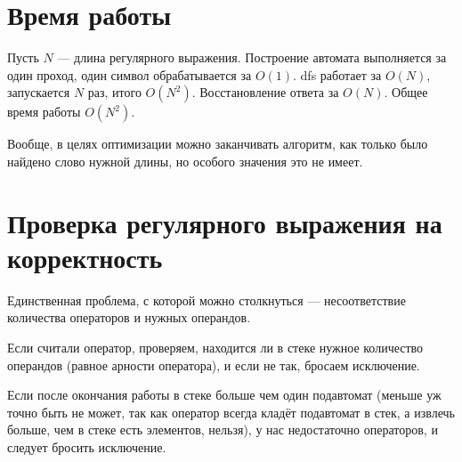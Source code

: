 \documentclass[a4paper,10pt, russian]{article}
\begin{document}
	\section{Время работы}
	Пусть $N$ --- длина регулярного выражения. Построение автомата выполняется за один проход, один символ обрабатывается за $O(1)$. dfs работает за $O(N)$, запускается $N$ раз, итого $O(N^2)$. Восстановление ответа за $O(N)$. Общее время работы $O(N^2)$.
	
	Вообще, в целях оптимизации можно заканчивать алгоритм, как только было найдено слово нужной длины, но особого значения это не имеет.
	
	\section{Проверка регулярного выражения на корректность}
	Единственная проблема, с которой можно столкнуться --- несоответствие количества операторов и нужных операндов. 
	
	Если считали оператор, проверяем, находится ли в стеке нужное количество операндов (равное арности оператора), и если не так, бросаем исключение.
	
	Если после окончания работы в стеке больше чем один подавтомат (меньше уж точно быть не может, так как оператор всегда кладёт подавтомат в стек, а извлечь больше, чем в стеке есть элементов, нельзя), у нас недостаточно операторов, и следует бросить исключение.
\end{document}
